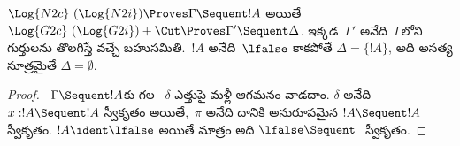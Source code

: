 \documentclass[../../../include/open-logic-section]{subfiles}
\begin{document}


\begin{prop} $\Log{N2c}\ (\Log{N2i}) \Proves
\Gamma \Sequent !A$ అయితే $\Log{G2c}\ (\Log{G2i}) + \Cut \Proves \Gamma'
\Sequent \Delta$. ఇక్కడ~$\Gamma'$ అనేది~$\Gamma$లోని గుర్తులను తొలగిస్తే వచ్చే  బహుసమితి.~$!A$ అనేది~$\lfalse$ కాకపోతే $\Delta = \{!A\}$, అది అసత్య సూత్రమైతే $\Delta = \emptyset$.
\end{prop}

\begin{proof}
~$\Gamma \Sequent !A$కు గల ~$\delta$ ఎత్తుపై మళ్లీ ఆగమనం వాడదాం. $\delta$ అనేది $x:!A \Sequent !A$ స్వీకృతం అయితే,~$\pi$ అనేది దానికి అనురూపమైన $!A \Sequent !A$ స్వీకృతం. $!A \ident \lfalse$ అయితే మాత్రం అది $\lfalse \Sequent \ $ స్వీకృతం.


\end{proof}
\end{document}
